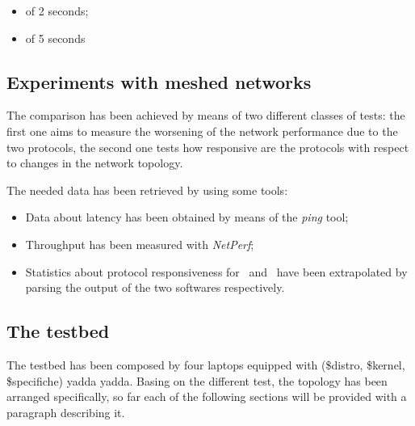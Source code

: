         \begin{itemize}
        \item   {} of 2 seconds;
        \item   {} of 5 seconds
        \end{itemize}

\subsection{Experiments with meshed networks}

    The comparison has been achieved by means of two different classes
    of tests: the first one aims to measure the worsening of the network
    performance due to the two protocols, the second one tests how
    responsive are the protocols with respect to changes in the
    network topology.

    The needed data has been retrieved by using some tools:
    \begin{itemize}
    \item   Data about latency has been obtained by means of the
            \emph{ping} tool;
    \item   Throughput has been measured with
            \emph{NetPerf}\cite{bib:NetPerf};
    \item   Statistics about protocol responsiveness for \batman\ and
            \olsr\ have been extrapolated by parsing the output of the
            two softwares respectively.
    \end{itemize}

\subsection{The testbed}

    The testbed has been composed by four laptops equipped with
    (\$distro, \$kernel, \$specifiche) yadda yadda. Basing on the
    different test, the topology has been arranged specifically, so
    far each of the following sections will be provided with a
    paragraph describing it.

